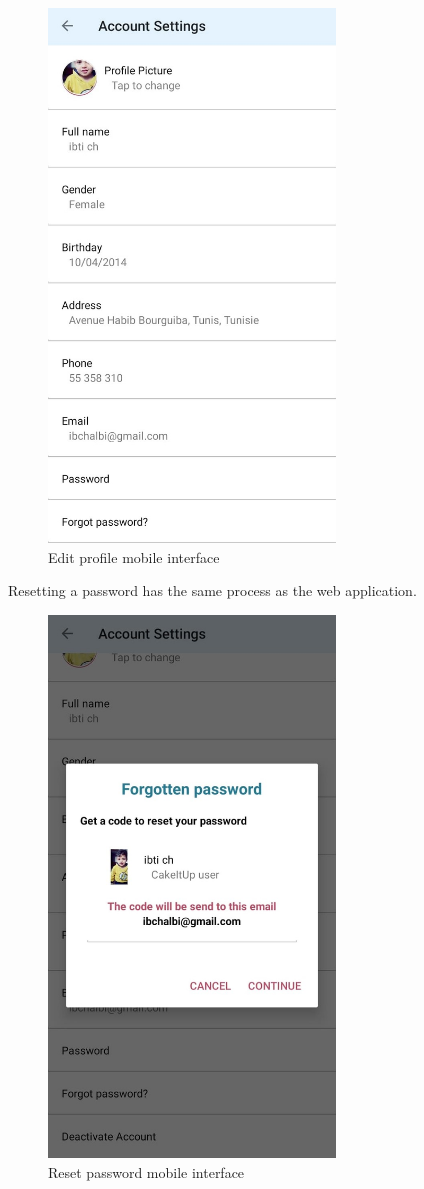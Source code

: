 \documentclass[12pt,a4paper]{report}
\begin{document}
\begin{figure}[H]
		\vspace*{1in}
	\centering
	\includegraphics[width=3in,keepaspectratio]{editprofilemobile.jpg}
	\caption{Edit profile mobile interface}
	\label{editprofilemobile-interface}
\end{figure}
\clearpage
Resetting a password has the same process as the web application.
\begin{figure}[H]
			\vspace*{1in}
	\centering
	\includegraphics[width=3in,keepaspectratio]{resetpasswordmobile.jpg}
	\caption{Reset password mobile interface}
	\label{resetpasswordmobile-interface}
\end{figure}
\end{document}
